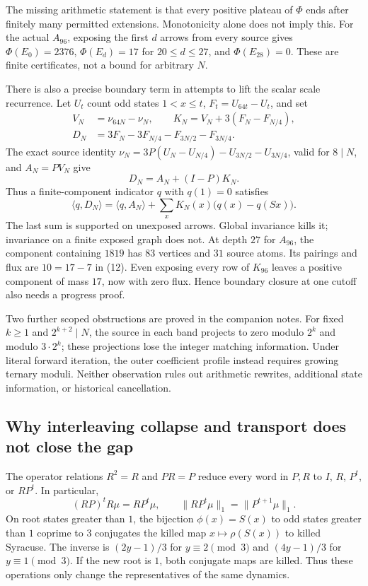 \documentclass[11pt]{article}
\begin{document}
The missing arithmetic statement is that every positive plateau of
$\Phi$ ends after finitely many permitted extensions. Monotonicity alone
does not imply this. For the actual $A_{96}$, exposing the first $d$
arrows from every source gives $\Phi(E_0)=2376$,
$\Phi(E_d)=17$ for $20\le d\le27$, and $\Phi(E_{28})=0$.
These are finite certificates, not a bound for arbitrary $N$.

There is also a precise boundary term in attempts to lift the scalar
scale recurrence. Let $U_t$ count odd states $1<x\le t$,
$F_t=U_{64t}-U_t$, and set
\[
\begin{split}
V_N&=\nu_{64N}-\nu_N,\qquad K_N=V_N+3(F_N-F_{N/4}),\\
D_N&=3F_N-3F_{N/4}-F_{3N/2}-F_{3N/4}.
\end{split}
\]
The exact source identity
$\nu_N=3P(U_N-U_{N/4})-U_{3N/2}-U_{3N/4}$, valid for $8\mid N$,
and $A_N=PV_N$ give
\[
D_N=A_N+(I-P)K_N.
\]
Thus a finite-component indicator $q$ with $q(1)=0$ satisfies
\[
\langle q,D_N\rangle=\langle q,A_N\rangle+
 \sum_x K_N(x)\bigl(q(x)-q(Sx)\bigr).                    \tag{12}
\]
The last sum is supported on unexposed arrows. Global invariance kills
it; invariance on a finite exposed graph does not.
At depth $27$ for $A_{96}$, the component containing $1819$ has
$83$ vertices and $31$ source atoms. Its pairings and flux are
$10=17-7$ in (12). Even exposing every row of $K_{96}$ leaves a
positive component of mass $17$, now with zero flux. Hence boundary
closure at one cutoff also needs a progress proof.

Two further scoped obstructions are proved in the companion notes.
For fixed $k\ge1$ and $2^{k+2}\mid N$, the source in each band projects
to zero modulo $2^k$ and modulo $3\cdot2^k$; these projections lose
the integer matching information. Under literal forward iteration,
the outer coefficient profile instead requires growing ternary moduli.
Neither observation rules out arithmetic rewrites, additional state
information, or historical cancellation.

\subsection{Why interleaving collapse and transport does not close the gap}
The operator relations $R^2=R$ and $PR=P$ reduce every word in $P,R$
to $I$, $R$, $P^t$, or $RP^t$. In particular,
\[
(RP)^tR\mu=RP^t\mu,\qquad
\|RP^t\mu\|_1=\|P^{t+1}\mu\|_1.
\]
On root states greater than $1$, the bijection $\phi(x)=S(x)$ to odd
states greater than $1$ coprime to $3$ conjugates the killed map
$x\mapsto\rho(S(x))$ to killed Syracuse. The inverse is
$(2y-1)/3$ for $y\equiv2\pmod3$ and $(4y-1)/3$ for
$y\equiv1\pmod3$. If the new root is $1$, both conjugate maps are killed.
Thus these operations only change the representatives of the same dynamics.
\end{document}
